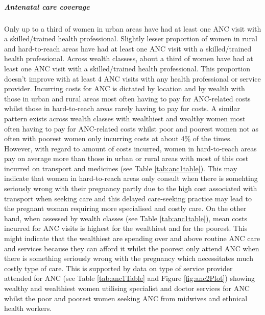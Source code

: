 \documentclass[12pt,a4paper]{article}
\let\oldsubparagraph\subparagraph
\renewcommand{\subparagraph}[1]{\oldsubparagraph{#1}\mbox{}}
\begin{document}
\hypertarget{ancCoverage}{%
\subparagraph{Antenatal care coverage}\label{ancCoverage}}

Only up to a third of women in urban areas have had at least one ANC visit with a skilled/trained health professional. Slightly lesser proportion of women in rural and hard-to-reach areas have had at least one ANC visit with a skilled/trained health professional. Across wealth classess, about a third of women have had at least one ANC visit with a skilled/trained health professional. This proportion doesn't improve with at least 4 ANC visits with any health professional or service provider. Incurring costs for ANC is dictated by location and by wealth with those in urban and rural areas most often having to pay for ANC-related costs whilst those in hard-to-reach areas rarely having to pay for costs. A similar pattern exists across wealth classes with wealthiest and wealthy women most often having to pay for ANC-related costs whilst poor and poorest women not as often with poorest women only incurring costs at about 4\% of the times. However, with regard to amount of costs incurred, women in hard-to-reach areas pay on average more than those in urban or rural areas with most of this cost incurred on transport and medicines (see Table \ref{tab:anc1table}). This may indicate that women in hard-to-reach areas only consult when there is somehting seriously wrong with their pregnancy partly due to the high cost associated with transport when seeking care and this delayed care-seeking practice may lead to the pregnant woman requiring more specialised and costly care. On the other hand, when assessed by wealth classes (see Table \ref{tab:anc1table}), mean costs incurred for ANC visits is highest for the wealthiest and for the poorest. This might indicate that the wealthiest are spending over and above routine ANC care and services because they can afford it whilst the poorest only attend ANC when there is something seriously wrong with the pregnancy which necessitates much costly type of care. This is supported by data on type of service provider attended for ANC (see Table \ref{tab:anc1Table} and Figure \ref{fig:anc2Plot}) showing wealthy and wealthiest women utilising specialist and doctor services for ANC whilst the poor and poorest women seeking ANC from midwives and ethnical health workers.
\end{document}
